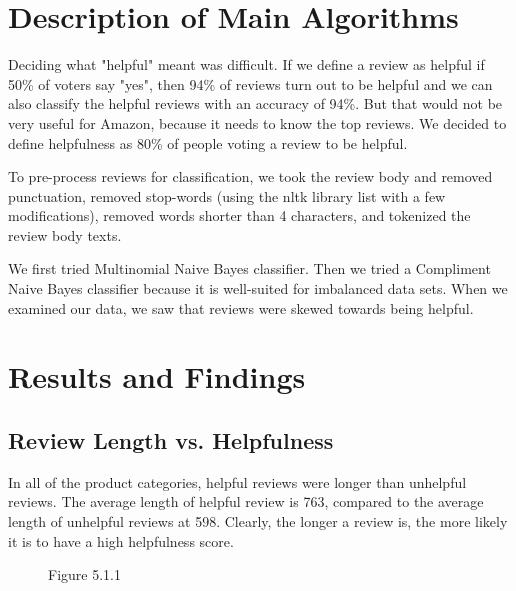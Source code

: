 \documentclass[11pt]{article}
\begin{document}
\section{Description of Main Algorithms}

Deciding what "helpful" meant was difficult. If we define a review as helpful if 50\% of voters say "yes", then 94\% of reviews turn out to be helpful and we can also classify the helpful reviews with an accuracy of 94\%. But that would not be very useful for Amazon, because it needs to know the top reviews. We decided to define helpfulness as 80\% of people voting a review to be helpful.

To pre-process reviews for classification, we took the review body and removed punctuation, removed stop-words (using the nltk library list with a few modifications), removed words shorter than 4 characters, and tokenized the review body texts.

We first tried Multinomial Naive Bayes classifier. Then we tried a Compliment Naive Bayes classifier because it is well-suited for imbalanced data sets. When we examined our data, we saw that reviews were skewed towards being helpful. 

\vspace{0.5em}
\section{Results and Findings}

\subsection{Review Length vs. Helpfulness}
In all of the product categories, helpful reviews were longer than unhelpful reviews. The average length of helpful review is 763, compared to the average length of unhelpful reviews at 598. Clearly, the longer a review is, the more likely it is to have a high helpfulness score. 

\begin{figure}[!htb]
\begin{center}
Figure 5.1.1
\end{center}
\end{figure}
\end{document}
